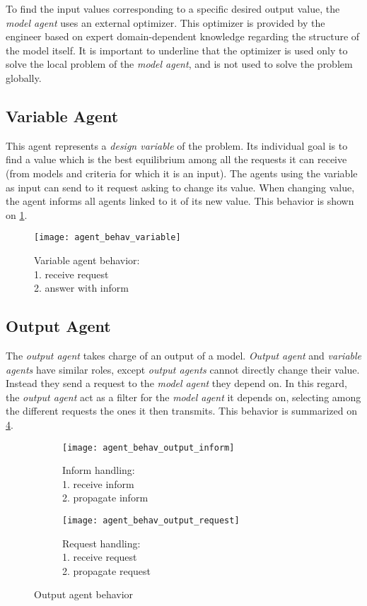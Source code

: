 To find the input values corresponding to a specific desired output value, the \emph{model agent} uses an external optimizer. This optimizer is provided by the engineer based on expert domain-dependent knowledge regarding the structure of the model itself.
It is important to underline that the optimizer is used only to solve the local problem of the \emph{model agent}, and is  not used to solve the problem globally.

\subsection{Variable Agent}

This agent represents a \emph{design variable} of the problem. Its individual goal is to find a value which is the best equilibrium among all the requests it can receive (from models and criteria for which it is an input). The agents using the variable as input can send to it request asking to change its value. When changing value, the agent informs all agents linked to it of its new value. This behavior is shown on \figurename{} \ref{agent_behav_variable}. 

\begin{figure}
\centering
\texttt{[image: agent\_behav\_variable]}
\caption{Variable agent behavior:\\1. receive request\\2. answer with inform}\label{agent_behav_variable}
\end{figure}

\subsection{Output Agent}
The \emph{output agent} takes charge of an output of a model. \emph{Output agent} and \emph{variable agents} have similar roles, except \emph{output agents} cannot directly change their value. Instead they send a request to the \emph{model agent} they depend on. In this regard, the \emph{output agent} act as a filter for the \emph{model agent} it depends on, selecting among the different requests the ones it then transmits. This behavior is summarized on \figurename{} \ref{agent_behav_output}.

\begin{figure}
\centering
\begin{subfigure}{0.25\textwidth}
		\centering
		\texttt{[image: agent\_behav\_output\_inform]}
		\caption{Inform handling:\\1. receive inform\\2. propagate inform}\label{agent_behav_output:inf}
\end{subfigure}
\qquad
\begin{subfigure}{0.25\textwidth}
		\centering
		\texttt{[image: agent\_behav\_output\_request]}
		\caption{Request handling:\\1. receive request\\2. propagate request}\label{agent_behav_output:req}
\end{subfigure}
\caption{Output agent behavior}\label{agent_behav_output}
\end{figure}

